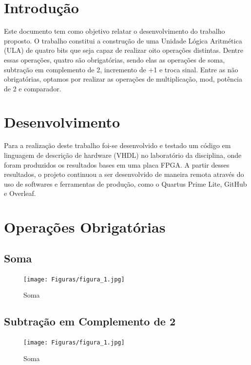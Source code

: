 \documentclass[a4paper, 12pt]{article}
\begin{document}
\newpage
{}

\section{Introdução}

Este documento tem como objetivo relatar o desenvolvimento do trabalho proposto. O trabalho constitui a construção de uma Unidade Lógica Aritmética (ULA) de quatro bits que seja capaz de realizar oito operações distintas. Dentre essas operações, quatro são obrigatórias, sendo elas as operações de soma, subtração em complemento de 2, incremento de +1 e troca sinal. Entre as não obrigatórias, optamos por realizar as operações de multiplicação, mod, potência de 2 e comparador.
\section{Desenvolvimento}

Para a realização deste trabalho foi-se desenvolvido e testado um código em linguagem de descrição de hardware (VHDL) no laboratório da disciplina, onde foram produzidos os resultados bases em uma placa FPGA. A partir desses resultados, o projeto continuou a ser desenvolvido de maneira remota através do uso de softwares e ferramentas de produção, como o Quartus Prime Lite, GitHub e Overleaf. 

\section{Operações Obrigatórias}


\subsection{Soma}

\begin{figure}[h]
\caption{Soma}

\centering
\texttt{[image: Figuras/figura\_1.jpg]}
\label{figura:qualquernome}
\end{figure}

\subsection{Subtração em Complemento de 2}

\begin{figure}[h]
\caption{Soma}

\centering
\texttt{[image: Figuras/figura\_1.jpg]}
\label{figura:qualquernome}
\end{figure}
\end{document}
